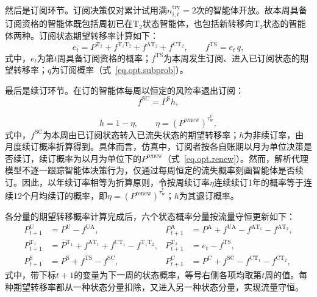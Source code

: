 然后是订阅环节。订阅决策仅对累计试用满$n_{i,t}^{\mathrm{try}} =2 $次的智能体开放。故本周具备订阅资格的智能体既包括周初已在$\mathrm{T}_{2}$状态智能体，也包括新转移向$\mathrm{T}_{2}$状态的智能体两种。订阅状态期望转移率计算如下：
\begin{equation}
e_{t} = P^{\mathrm{T}_{2}}+f^{\mathrm{T}_{1}\mathrm{T}_{2}}+f^{\mathrm{AT}_{2}}+f^{\mathrm{CT}_{2}},\qquad
f^{\mathrm{TS}} = e_{t}\,q,
\label{eq.opt.mfsub}
\end{equation}
式中，$e_{t}$为第$t$周具备订阅资格的概率；$f^{\mathrm{TS}}$为本周发生订阅、进入已订阅状态的期望转移率；$q$为订阅概率（式~\eqref{eq.opt.subprob}）。
 
最后是续订环节。在订的智能体每周以恒定的风险率退出订阅：
\begin{equation}
f^{\mathrm{SC}} = P^{\mathrm{S}}h,
\label{eq.opt.mfchurn}
\end{equation}

\begin{equation}
h = 1-\eta,\qquad \eta=\left(P^{\mathrm{renew}}\right)^{\tau^{\mathrm{y}} _{\mathrm{w}}},
\label{eq.opt.renewhazard}
\end{equation}
式中，$f^{\mathrm{SC}}$为本周由已订阅状态转入已流失状态的期望转移率；$h$为非续订率，由月度续订概率折算得到。具体而言，仿真中，订阅者按各自账期以月为单位决策是否续订，续订概率为以月为单位下的$P^{\mathrm{renew}}$（式~\eqref{eq.opt.renew}）。然而，解析代理模型不逐一跟踪智能体决策行为，仅通过每周恒定的流失概率刻画智能体是否续订。因此，以年续订率相等为折算原则，令按周续订率$\eta$连续续订1年的概率等于连续12个月均续订的概率，即$\eta=\left(P^{\mathrm{renew}}\right)^{\tau^{\mathrm{y}} _{\mathrm{w}}}$；$h$为其退订概率。
 
各分量的期望转移概率计算完成后，六个状态概率分量按流量守恒更新如下：
\begin{equation}
\begin{aligned}
P_{t+1}^{\mathrm{U}} &= P^{\mathrm{U}}-f^{\mathrm{UA}}, &
P_{t+1}^{\mathrm{A}} &= P^{\mathrm{A}}+f^{\mathrm{UA}}-f^{\mathrm{AT}_{1}}-f^{\mathrm{AT}_{2}},\\
P_{t+1}^{\mathrm{T}_{1}} &= P^{\mathrm{T}_{1}}+f^{\mathrm{AT}_{1}}+f^{\mathrm{CT}_{1}}-f^{\mathrm{T}_{1}\mathrm{T}_{2}}, &
P_{t+1}^{\mathrm{T}_{2}} &= e_{t}-f^{\mathrm{TS}},\\
P_{t+1}^{\mathrm{S}} &= P^{\mathrm{S}}+f^{\mathrm{TS}}-f^{\mathrm{SC}}, &
P_{t+1}^{\mathrm{C}} &= P^{\mathrm{C}}+f^{\mathrm{SC}}-f^{\mathrm{CT}_{1}}-f^{\mathrm{CT}_{2}},
\end{aligned}
\label{eq.opt.meanfield}
\end{equation}
式中，带下标$t+1$的变量为下一周的状态概率，等号右侧各项均取第$t$周的值。每种期望转移率都从一种状态分量扣除，又进入另一种状态分量，实现流量守恒。

